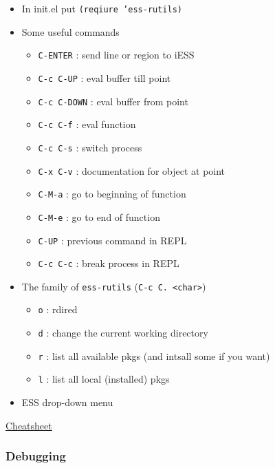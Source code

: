 \documentclass[11pt]{article}
\begin{document}
\begin{itemize}
\item In init.el put \texttt{(reqiure 'ess-rutils)}

\item Some useful commands
\begin{itemize}
\item \texttt{C-ENTER}     : send line or region to iESS
\item \texttt{C-c C-UP}    : eval buffer till point
\item \texttt{C-c C-DOWN}  : eval buffer from point
\item \texttt{C-c C-f}     : eval function
\item \texttt{C-c C-s}     : switch process
\item \texttt{C-x C-v}     : documentation for object at point
\item \texttt{C-M-a}       : go to beginning of function
\item \texttt{C-M-e}       : go to end of function
\item \texttt{C-UP}        : previous command in REPL
\item \texttt{C-c C-c}     : break process in REPL
\end{itemize}

\item The family of \texttt{ess-rutils} (\texttt{C-c C. <char>}) 
\begin{itemize}
\item \texttt{o} : rdired
\item \texttt{d} : change the current working directory
\item \texttt{r} : list all available pkgs (and intsall some if you want)
\item \texttt{l} : list all local (installed) pkgs
\end{itemize}

\item ESS drop-down menu
\end{itemize}

\href{http://ess.r-project.org/refcard.pdf}{Cheatsheet}

\subsubsection{Debugging}
\label{sec:org81c9a55}
\end{document}

